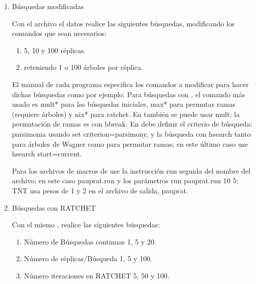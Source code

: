\begin{itemize}
\begin{enumerate}
	  \item{B\'usquedas modificadas}

		Con el archivo el datos  realice las siguientes b\'usquedas, modificando los comandos que sean necesarios:

    \begin{enumerate}
      \item 5, 10 y 100 r\'eplicas.
      \item reteniendo 1 o 100 \'arboles por r\'eplica.
    \end{enumerate}  
 
 
	El manual de cada programa especifica los comandos a modificar para hacer dichas b\'usquedas como por ejemplo: Para b\'usquedas con ,  el comando m\'as usado es mult*  para las b\'usquedas iniciales,   max*  para permutar ramas (requiere \'arboles) y nix*  para ratchet. En  tambi\'en se puede usar mult; la permutaci\'on de ramas es con bbreak.  En  debe definir el criterio de  b\'usqueda: parsimonia usando set criterion=parsimony,  y la b\'usqueda con hsearch tanto para \'arboles de Wagner como para permutar ramas; en este \'ultimo caso use hsearch start=current.

	Para los archivos de macros de  use la instrucci\'on run seguida del nombre del archivo; en este caso pauprat.run y los par\'ametros run pauprat.run 10 5; TNT usa pesos de 1 y 2 en el archivo de salida,  pauprat.
 
 




	\item{B\'usquedas con RATCHET}

	Con el mismo , realice las siguientes b\'usquedas:

  \begin{enumerate}
    \item N\'umero de B\'usquedas continuas 1, 5 y 20.
    \item N\'umero de r\'eplicas/B\'usqueda 1, 5 y 100.
    \item N\'umero iteraciones en RATCHET 5, 50 y 100.
  \end{enumerate}  





\end{enumerate}
\end{itemize}
